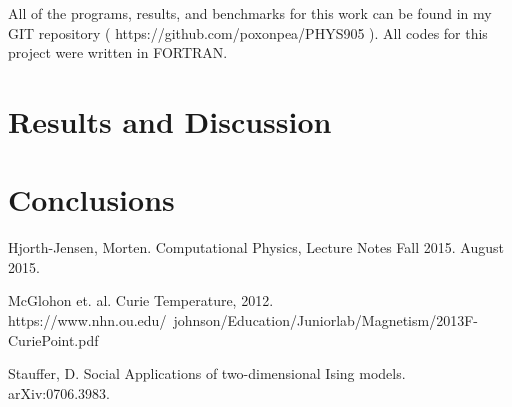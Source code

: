 \documentclass[%
oneside,                 %
final,                   %
10pt]{article}
\begin{document}
All of the programs, results, and benchmarks for this work can be found in my GIT repository ( https://github.com/poxonpea/PHYS905 ).  All codes for this project were written in FORTRAN.

\section{Results and Discussion}


\section{Conclusions}


\begin{comment}

\begin{figure}[H]\label{fig:compzoom}
  \centering
    \texttt{[image: compzoom.eps]}
    \caption{A zoomed in view of the convergence to the exact solution}
\end{figure}

\begin{center} 
\begin{tabular}{ |c|c|c|c| }
\hline
Size of Matrix ($10^n$) & General & Tailored & LU \\
\hline
1& 3.00 E -6 & 3.00 E -6 & 2.40 E -5\\ 
2 & 4.00 E -6 & 4.00 E -6 & 1.71 E -3 \\ 
3 & 3.90 E -5 & 1.90 E -5 & 1.93\\ 
4 & 3.79 E -4 & 2.09 E -4 & N/A\\ 
5 & 3.38 E -3 & 1.51 E -3  & N/A\\ 
6 & 2.87 E -2 & 1.53 E -2 & N/A\\ 
7 & 3.16 E -1 & 1.73 E -1& N/A\\ 
\hline
\end{tabular}
\label{table:test}
\end{center}

\end{comment}

\begin{thebibliography}{9}

Hjorth-Jensen, Morten. 
Computational Physics, Lecture Notes Fall 2015. 
August 2015.

McGlohon et. al.
Curie Temperature, 2012.
https://www.nhn.ou.edu/~johnson/Education/Juniorlab/Magnetism/2013F-CuriePoint.pdf

Stauffer, D.
Social Applications of two-dimensional Ising models.
arXiv:0706.3983.

\end{thebibliography}



\end{document}
